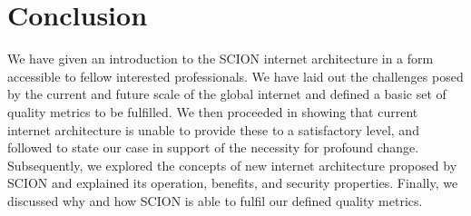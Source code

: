 \documentclass[../eva1_scion.tex]{subfiles}
\begin{document}
    \section{Conclusion}\label{sec:conlusion}
    We have given an introduction to the SCION internet architecture in a form accessible to fellow interested professionals. We have laid out the challenges posed by the current and future scale of the global internet and defined a basic set of quality metrics to be fulfilled. We then proceeded in showing that current internet architecture is unable to provide these to a satisfactory level, and followed to state our case in support of the necessity for profound change. Subsequently, we explored the concepts of new internet architecture proposed by SCION and explained its operation, benefits, and security properties. Finally, we discussed why and how SCION is able to fulfil our defined quality metrics.
\end{document}

